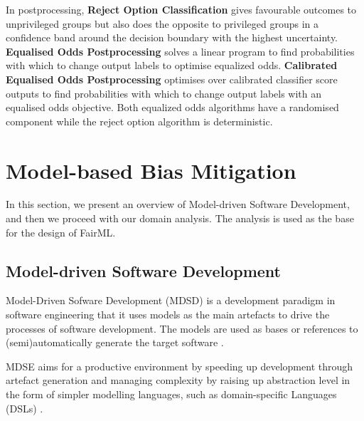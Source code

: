 \documentclass[sigconf,review]{acmart}
\begin{document}


In postprocessing, \textbf{Reject Option Classification} \cite{kamiran2012reject} gives favourable outcomes to unprivileged groups but also does the opposite to privileged groups in a confidence band around the decision boundary with the highest uncertainty.
\textbf{Equalised Odds Postprocessing} \cite{hardt2016equal,pleiss2017equal} solves a linear program to find probabilities with which to change output labels to optimise equalized odds.
\textbf{Calibrated Equalised Odds Postprocessing} \cite{pleiss2017equal} optimises over calibrated classifier score outputs to find probabilities with which to change output labels with an equalised odds
objective. 
Both equalized odds algorithms have a randomised component while the reject option algorithm is deterministic.


\section{Model-based Bias Mitigation}
\label{sec:model_based_bias_mitigation}

In this section, we present an overview of Model-driven Software Development, and then we proceed with our domain analysis. The analysis is used as the base for the design of FairML. 


\subsection{Model-driven Software Development}
\label{sec:model_based_software_development}
Model-Driven Sofware Development (MDSD) is a development paradigm in software engineering that it uses models as the main artefacts to drive the processes of software development. The models are used as bases or references to (semi)automatically generate the target software \cite{brambilla2017model}. 

MDSE aims for a productive environment by speeding up development through artefact generation and managing complexity by raising up abstraction level in the form of simpler modelling languages, such as domain-specific Languages (DSLs) \cite{volter2013model}. 
\end{document}
